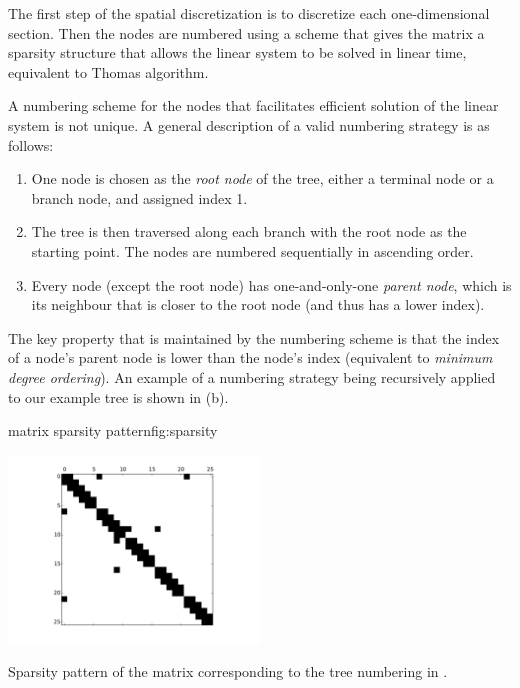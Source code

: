 The first step of the spatial discretization is to discretize each one-dimensional section. Then the nodes are numbered using a scheme that gives the matrix a sparsity structure that allows the linear system to be solved in linear time, equivalent to Thomas algorithm.

A numbering scheme for the nodes that facilitates efficient solution of the linear system is not unique. A general description of a valid numbering strategy is as follows:
\begin{enumerate}
    \item
        One node is chosen as the \emph{root node} of the tree, either a terminal node or a branch node, and assigned index 1.
    \item
        The tree is then traversed along each branch with the root node as the starting point. The nodes are numbered sequentially in ascending order.
    \item
        Every node (except the root node) has one-and-only-one \emph{parent node}, which is its neighbour that is closer to the root node (and thus has a lower index).
\end{enumerate}
The key property that is maintained by the numbering scheme is that the index of a node's parent node is lower than the node's index (equivalent to \emph{minimum degree ordering}). An example of a numbering strategy being recursively applied to our example tree is shown in (b).

\begin{myfigure}{matrix sparsity pattern}{fig:sparsity}
\begin{center}
\includegraphics[width=0.5\textwidth]{./images/sparsity.pdf}
\end{center}
Sparsity pattern of the matrix corresponding to the tree numbering in .
\end{myfigure}

